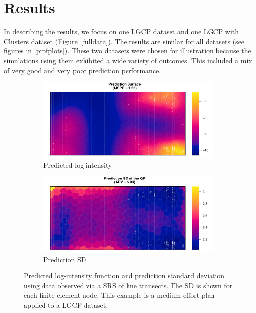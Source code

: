 \documentclass[review]{elsarticle}
\begin{document}
\section{Results}


In describing the results, we focus on one LGCP dataset and one LGCP with
Clusters dataset (Figure~\ref{fulldata}). The results are similar for all
datasets (see figures in \ref{profplots}). These two datasets were chosen for
illustration because the simulations using them exhibited a wide variety of
outcomes. This included a mix of very good and very poor prediction
performance.

\begin{figure}

\begin{subfigure}{5in}
\includegraphics[width=5in]{../graphics/lambda-SRS000187-LGCP000004.pdf}
\caption{Predicted log-intensity}
\label{lambdasrs000187lgcp}
\end{subfigure}

\begin{subfigure}{5in}
\includegraphics[width=5in]{../graphics/lambdaSD-SRS000187-LGCP000004.pdf}
\caption{Prediction SD}
\label{sdsrs000187lgcp}
\end{subfigure}

\caption{Predicted log-intensity function and prediction standard deviation
using data observed via a SRS of line transects. The SD is shown for each
finite element node. This example is a medium-effort plan applied to a
LGCP dataset.}
\label{srs000187lgcp}
\end{figure}
\end{document}
